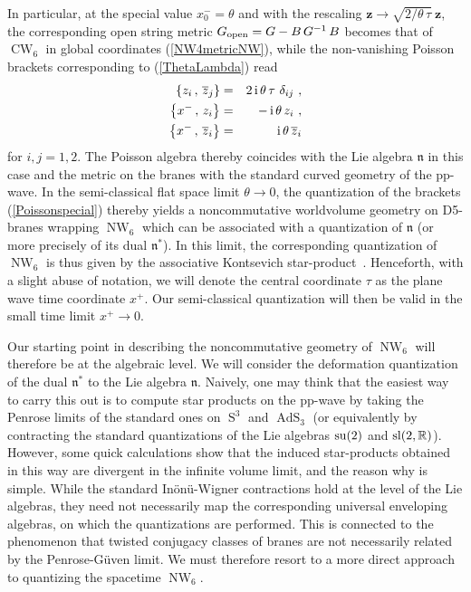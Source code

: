 \documentclass[11pt,a4paper]{article}
\DeclareMathOperator{\AdS}{AdS}
\DeclareMathOperator{\Sphere}{S}
\DeclareMathOperator{\NW}{NW}
\DeclareMathOperator{\CW}{CW}
\let\S\Sphere
\newcommand{\mbf}[1]{{\boldsymbol {#1} }}
\def\ii{{\,{\rm i}\,}}
\def\mz{{\mbf z}}
\newcommand{\real}{{\mathbb R}} %
\newcommand{\beq}{\begin{eqnarray}}
\newcommand{\eeq}{\end{eqnarray}}
\begin{document}
In particular, at the special value
$x_0^-=\theta$ and with the rescaling $\mz\to\sqrt{2/\theta\,\tau}~\mz$, the
corresponding open string metric $G_{\rm open}=G-B\,G^{-1}\,B$ becomes
that of $\CW_6$ in global coordinates (\ref{NW4metricNW}), while the
non-vanishing Poisson brackets corresponding to (\ref{ThetaLambda})
read
\beq
\left\{z_i\,,\,\overline{z}_j\right\}&=&2\ii\theta\,\tau~\delta_{ij} \ ,
\nonumber\\ \left\{x^-\,,\,z_i\right\}&=&-\ii\theta\,z_i \ ,
\nonumber\\ \left\{x^-\,,\,\overline{z}_i\right\}&=&\ii\theta\,
\overline{z}_i
\label{Poissonspecial}\eeq
for $i,j=1,2$. The Poisson algebra thereby coincides with the
Lie algebra $\mathfrak{n}$ in this case and the metric
on the branes with the standard curved geometry of the pp-wave. In the
semi-classical flat space limit $\theta\to0$, the
quantization of the brackets (\ref{Poissonspecial}) thereby yields a
noncommutative worldvolume geometry on D5-branes wrapping $\NW_6$
which can be associated with a quantization of $\mathfrak{n}$ (or
more precisely of its dual $\mathfrak{n}^*$). In this limit, the
corresponding quantization of $\NW_6$ is thus given by the associative
Kontsevich star-product~\cite{Kont1}. Henceforth, with a slight abuse
of notation, we will denote the central coordinate $\tau$ as the plane
wave time coordinate $x^+$. Our semi-classical quantization will then
be valid in the small time limit $x^+\to0$.

Our starting point in describing the noncommutative geometry of
$\NW_6$ will therefore be at the algebraic level. We will consider the
deformation quantization of the dual $\mathfrak{n}^*$ to the Lie
algebra $\mathfrak{n}$. Naively,
one may think that the easiest way to carry this out is to compute star
products on the pp-wave by taking the Penrose limits of the
standard ones on $\S^3$ and $\AdS_3$ (or equivalently by contracting
the standard quantizations of the Lie algebras ${\rm su}(2)$ and ${\rm
  sl}(2,\real)$). However, some quick calculations show that the
induced star-products obtained in this way are divergent in the
infinite volume limit, and the reason why is
simple. While the standard In\"on\"u-Wigner contractions hold at the
level of the Lie algebras, they need not necessarily map the
corresponding universal enveloping algebras, on
which the quantizations are performed. This is connected to the
phenomenon that twisted conjugacy classes of branes are not
necessarily related by the Penrose-G\"uven limit. We must therefore
resort to a more direct approach to quantizing the spacetime $\NW_6$.
\end{document}
